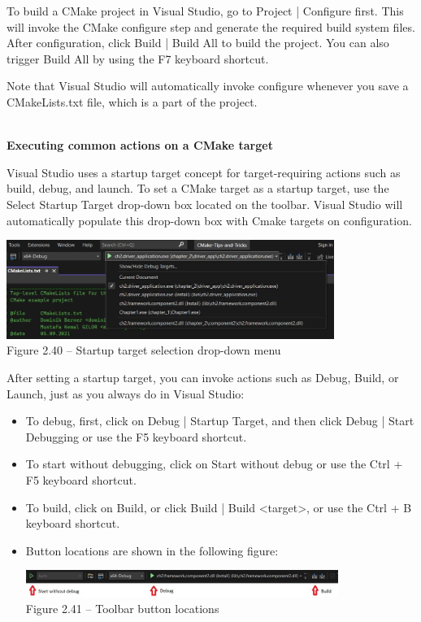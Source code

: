 To build a CMake project in Visual Studio, go to Project | Configure first. This will invoke the CMake configure step and generate the required build system files. After configuration, click Build | Build All to build the project. You can also trigger Build All by using the F7 keyboard shortcut.

Note that Visual Studio will automatically invoke configure whenever you save a CMakeLists.txt file, which is a part of the project.

\hspace*{\fill} \\ %
\noindent
\textbf{Executing common actions on a CMake target}

Visual Studio uses a startup target concept for target-requiring actions such as build, debug, and launch. To set a CMake target as a startup target, use the Select Startup Target drop-down box located on the toolbar. Visual Studio will automatically populate this drop-down box with Cmake targets on configuration.

\begin{center}
\includegraphics[width=0.8\textwidth]{content/1/chapter2/images/40.jpg}\\
Figure 2.40 – Startup target selection drop-down menu
\end{center}

After setting a startup target, you can invoke actions such as Debug, Build, or Launch, just as you always do in Visual Studio:

\begin{itemize}
\item 
To debug, first, click on Debug | Startup Target, and then click Debug | Start Debugging or use the F5 keyboard shortcut.

\item 
To start without debugging, click on Start without debug or use the Ctrl + F5 keyboard shortcut.

\item 
To build, click on Build, or click Build | Build <target>, or use the Ctrl + B keyboard shortcut.

\item
Button locations are shown in the following figure:

\begin{center}
\includegraphics[width=0.8\textwidth]{content/1/chapter2/images/41.jpg}\\
Figure 2.41 – Toolbar button locations
\end{center}
\end{itemize}

